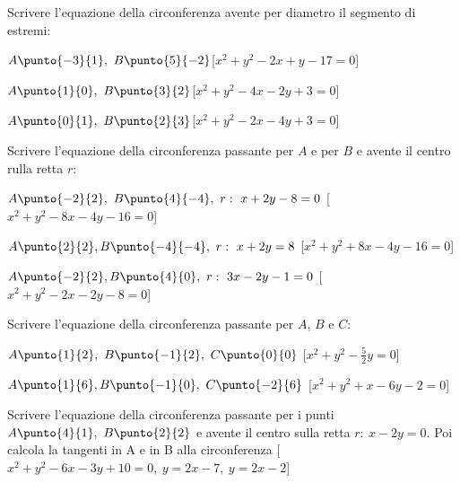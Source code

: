 \begin{esercizio}\label{ese:}
Scrivere l'equazione della circonferenza avente per diametro il segmento di 
estremi:
 \begin{enumeratea}
  \item  \(A\punto{-3}{1},~B\punto{5}{-2}\)\hfill [\(x^2+y^2-2x+y-17=0\)]
  \item  \(A\punto{1}{0},~B\punto{3}{2}\)\hfill [\(x^2+y^2-4x-2y+3=0\)]
  \item  \(A\punto{0}{1},~B\punto{2}{3}\)\hfill [\(x^2+y^2-2x-4y+3=0\)]
 \end{enumeratea}
\end{esercizio}

\begin{esercizio}\label{ese:}
Scrivere l'equazione della circonferenza passante per \(A\) e per \(B\) e 
avente il centro rulla retta \(r\):
 \begin{enumeratea}
  \item  \(A\punto{-2}{2},~B\punto{4}{-4},~r:~x+2y-8=0\)
  \hfill [\(x^2+y^2-8x-4y-16=0\)]
  \item  \(A\punto{2}{2}, B\punto{-4}{-4},~r:~x+2y=8\)
  \hfill [\(x^2+y^2+8x-4y-16=0\)]
  \item  \(A\punto{-2}{2}, B\punto{4}{0},~r:~3x-2y-1=0\)
  \hfill [\(x^2+y^2-2x-2y-8=0\)]
 \end{enumeratea}
\end{esercizio}

\begin{esercizio}\label{ese:}
Scrivere l'equazione della circonferenza passante per \(A\), \(B\) e \(C\):
 \begin{enumeratea}
  \item  \(A\punto{1}{2},~B\punto{-1}{2},~C\punto{0}{0}\)
  \hfill [\(x^2+y^2-\frac{5}{2}y=0\)]
  \item  \(A\punto{1}{6}, B\punto{-1}{0},~C\punto{-2}{6}\)
  \hfill [\(x^2+y^2+x-6y-2=0\)]
 \end{enumeratea}
\end{esercizio}

\begin{esercizio}\label{ese:}        
Scrivere l'equazione della circonferenza passante per i punti 
\(A\punto{4}{1},~B\punto{2}{2}\) e avente il centro sulla retta \(r:~x-2y=0\).
Poi calcola la tangenti in A e in B alla circonferenza 
\hfill [\(x^2+y^2-6x-3y+10=0,~y=2x-7,~y=2x-2\)]
\end{esercizio}


